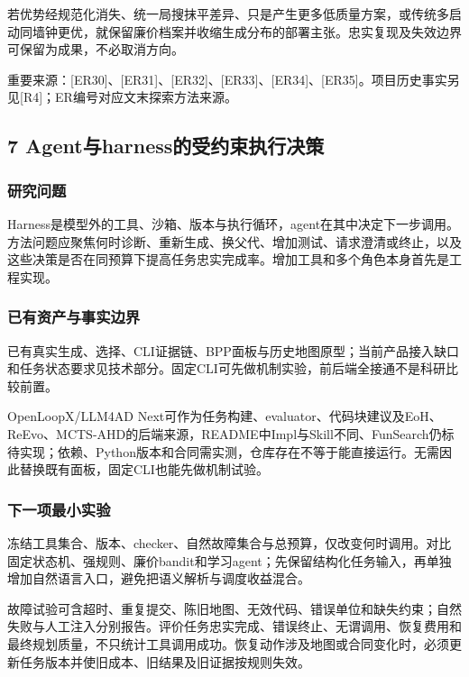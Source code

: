 \documentclass[11pt,a4paper]{article}
\newcommand{\bodytext}[1]{#1\par}
\newcommand{\sourcetext}[1]{{\fontsize{9.2}{14}\selectfont\color{Muted}#1\par}}
\begin{document}
\bodytext{若优势经规范化消失、统一局搜抹平差异、只是产生更多低质量方案，或传统多启动同墙钟更优，就保留廉价档案并收缩生成分布的部署主张。忠实复现及失效边界可保留为成果，不必取消方向。}
\sourcetext{重要来源：[ER30]、[ER31]、[ER32]、[ER33]、[ER34]、[ER35]。项目历史事实另见[R4]；ER编号对应文末探索方法来源。}
\subsection{7  Agent与harness的受约束执行决策}
\subsubsection{研究问题}
\bodytext{Harness是模型外的工具、沙箱、版本与执行循环，agent在其中决定下一步调用。方法问题应聚焦何时诊断、重新生成、换父代、增加测试、请求澄清或终止，以及这些决策是否在同预算下提高任务忠实完成率。增加工具和多个角色本身首先是工程实现。}
\subsubsection{已有资产与事实边界}
\bodytext{已有真实生成、选择、CLI证据链、BPP面板与历史地图原型；当前产品接入缺口和任务状态要求见技术部分。固定CLI可先做机制实验，前后端全接通不是科研比较前置。}
\bodytext{OpenLoopX/\allowbreak{}LLM4AD Next可作为任务构建、evaluator、代码块建议及EoH、ReEvo、MCTS-AHD的后端来源，README中Impl与Skill不同、FunSearch仍标待实现；依赖、Python版本和合同需实测，仓库存在不等于能直接运行。无需因此替换既有面板，固定CLI也能先做机制试验。}
\subsubsection{下一项最小实验}
\bodytext{冻结工具集合、版本、checker、自然故障集合与总预算，仅改变何时调用。对比固定状态机、强规则、廉价bandit和学习agent；先保留结构化任务输入，再单独增加自然语言入口，避免把语义解析与调度收益混合。}
\bodytext{故障试验可含超时、重复提交、陈旧地图、无效代码、错误单位和缺失约束；自然失败与人工注入分别报告。评价任务忠实完成、错误终止、无谓调用、恢复费用和最终规划质量，不只统计工具调用成功。恢复动作涉及地图或合同变化时，必须更新任务版本并使旧成本、旧结果及旧证据按规则失效。}
\end{document}
